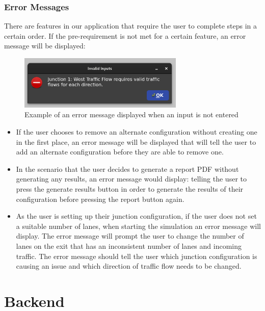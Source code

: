 \documentclass{article}
\begin{document}
    \subsubsection{Error Messages}
    There are features in our application that require the user to complete steps in a certain order.
    If the pre-requirement is not met for a certain feature, an error message will be displayed:

    \begin{figure}[H]
        \centering
        \includegraphics[width=0.7\textwidth]{example_error}
        \caption{Example of an error message displayed when an input is not entered}
        \label{fig:sampleError}
    \end{figure}

    \begin{itemize}
        \item If the user chooses to remove an alternate configuration without creating one in the first place, an error message will be displayed that will tell the user to add an alternate configuration before they are able to remove one.
        \item In the scenario that the user decides to generate a report PDF without generating any results, an error message would display: telling the user to press the generate results button in order to generate the results of their configuration before pressing the report button again.
        \item As the user is setting up their junction configuration, if the user does not set a suitable number of lanes, when starting the simulation an error message will display. The error message will prompt the user to change the number of lanes on the exit that has an inconsistent number of lanes and incoming traffic. The error message should tell the user which junction configuration is causing an issue and which direction of traffic flow needs to be changed.
    \end{itemize}


    \section{Backend}
\end{document}
